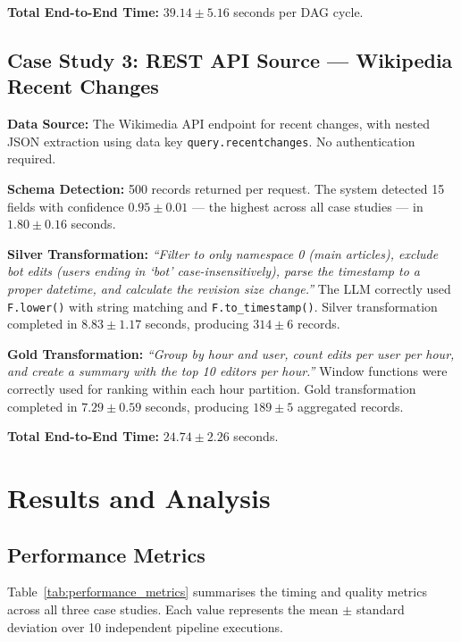 \textbf{Total End-to-End Time:} $39.14 \pm 5.16$ seconds per DAG cycle.

\subsection{Case Study 3: REST API Source --- Wikipedia Recent Changes}

\textbf{Data Source:} The Wikimedia API endpoint for recent changes, with nested JSON extraction using data key \texttt{query.recentchanges}. No authentication required.

\textbf{Schema Detection:} 500 records returned per request. The system detected 15 fields with confidence $0.95 \pm 0.01$ --- the highest across all case studies --- in $1.80 \pm 0.16$ seconds.

\textbf{Silver Transformation:} \textit{``Filter to only namespace 0 (main articles), exclude bot edits (users ending in `bot' case-insensitively), parse the timestamp to a proper datetime, and calculate the revision size change.''} The LLM correctly used \texttt{F.lower()} with string matching and \texttt{F.to\_timestamp()}. Silver transformation completed in $8.83 \pm 1.17$ seconds, producing $314 \pm 6$ records.

\textbf{Gold Transformation:} \textit{``Group by hour and user, count edits per user per hour, and create a summary with the top 10 editors per hour.''} Window functions were correctly used for ranking within each hour partition. Gold transformation completed in $7.29 \pm 0.59$ seconds, producing $189 \pm 5$ aggregated records.

\textbf{Total End-to-End Time:} $24.74 \pm 2.26$ seconds.


\section{Results and Analysis}

\subsection{Performance Metrics}

Table~\ref{tab:performance_metrics} summarises the timing and quality metrics across all three case studies. Each value represents the mean $\pm$ standard deviation over 10 independent pipeline executions.

